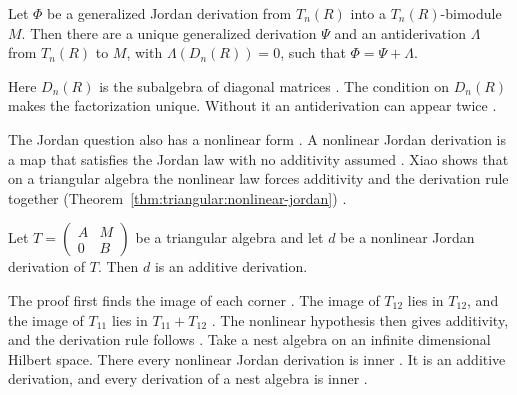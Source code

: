 \begin{theorem}\label{thm:triangular:ma-ji}
Let $\Phi$ be a generalized Jordan derivation from $T_n(R)$ into a
$T_n(R)$-bimodule $M$. Then there are a unique generalized derivation $\Psi$ and
an antiderivation $\Lambda$ from $T_n(R)$ to $M$, with
$\Lambda(D_n(R))=0$, such that $\Phi=\Psi+\Lambda$.
\end{theorem}

Here $D_n(R)$ is the subalgebra of diagonal matrices
\cite[p.~356]{MaJi2007}. The condition on $D_n(R)$ makes the factorization
unique. Without it an antiderivation can appear twice
\cite[p.~362]{MaJi2007}.

The Jordan question also has a nonlinear form \cite[p.~1]{Xiao2012}. A
nonlinear Jordan derivation is a map that satisfies the Jordan law with no
additivity assumed \cite[p.~1]{Xiao2012}. Xiao shows that on a triangular
algebra the nonlinear law forces additivity and the derivation rule together
(Theorem~\ref{thm:triangular:nonlinear-jordan}) \cite[Theorem~2.1,
p.~2]{Xiao2012}.\begin{theorem}\label{thm:triangular:nonlinear-jordan} Let
$T=\begin{pmatrix}A&M\\0&B\end{pmatrix}$ be a triangular algebra and let $d$
be a nonlinear Jordan derivation of $T$. Then $d$ is an additive derivation.
\end{theorem}

The proof first finds the image of each corner \cite[Lemmas~2.2--2.3,
p.~2]{Xiao2012}. The image of $T_{12}$ lies in $T_{12}$, and the image of
$T_{11}$ lies in $T_{11}+T_{12}$ \cite[Lemmas~2.2--2.3, p.~2]{Xiao2012}. The
nonlinear hypothesis then gives additivity, and the derivation rule follows
\cite[pp.~2--7]{Xiao2012}. Take a nest algebra on an infinite dimensional
Hilbert space. There every nonlinear Jordan derivation is inner
\cite[Proposition~2.11, p.~8]{Xiao2012}. It is an
additive derivation, and every derivation of a nest algebra is inner
\cite[Proposition~2.11, p.~8]{Xiao2012}.

